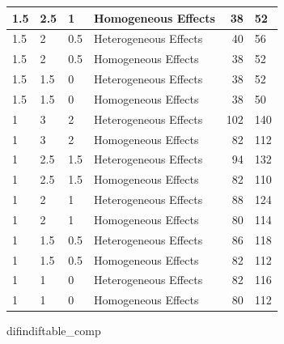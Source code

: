 \documentclass[
]{article}
\newenvironment{Shaded}{\begin{snugshade}}{\end{snugshade}}
\newcommand{\NormalTok}[1]{#1}
\begin{document}
\begin{table}[H]
\begin{tabular}{l|l|l|l|r|l}
\hline
\hspace{1em}1.5 & 2.5 & 1 & Homogeneous Effects & 38 & 52\\
\hline
\hspace{1em}1.5 & 2 & 0.5 & Heterogeneous Effects & 40 & 56\\
\hline
\hspace{1em}1.5 & 2 & 0.5 & Homogeneous Effects & 38 & 52\\
\hline
\hspace{1em}1.5 & 1.5 & 0 & Heterogeneous Effects & 38 & 52\\
\hline
\hspace{1em}1.5 & 1.5 & 0 & Homogeneous Effects & 38 & 50\\
\hline
\hspace{1em}1 & 3 & 2 & Heterogeneous Effects & 102 & 140\\
\hline
\hspace{1em}1 & 3 & 2 & Homogeneous Effects & 82 & 112\\
\hline
\hspace{1em}1 & 2.5 & 1.5 & Heterogeneous Effects & 94 & 132\\
\hline
\hspace{1em}1 & 2.5 & 1.5 & Homogeneous Effects & 82 & 110\\
\hline
\hspace{1em}1 & 2 & 1 & Heterogeneous Effects & 88 & 124\\
\hline
\hspace{1em}1 & 2 & 1 & Homogeneous Effects & 80 & 114\\
\hline
\hspace{1em}1 & 1.5 & 0.5 & Heterogeneous Effects & 86 & 118\\
\hline
\hspace{1em}1 & 1.5 & 0.5 & Homogeneous Effects & 82 & 112\\
\hline
\hspace{1em}1 & 1 & 0 & Heterogeneous Effects & 82 & 116\\
\hline
\hspace{1em}1 & 1 & 0 & Homogeneous Effects & 80 & 112\\
\hline
\end{tabular}
\end{table}

\begin{Shaded}
\begin{Highlighting}[]
\NormalTok{difindiftable\_comp}
\end{Highlighting}
\end{Shaded}
\end{document}
